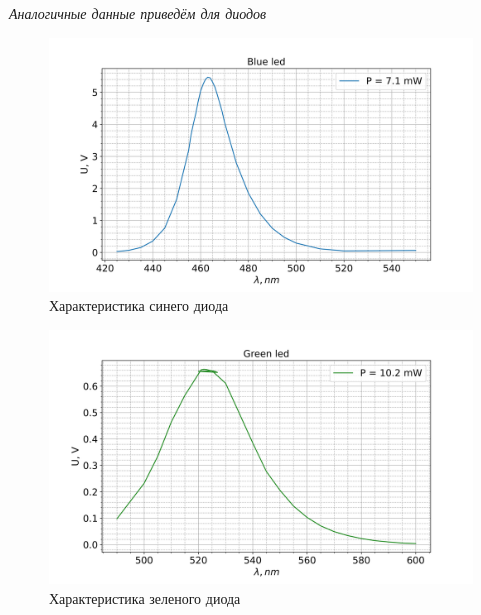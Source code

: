 \documentclass[a4paper]{article}
\begin{document}
        \par \textit{Аналогичные данные приведём для диодов}
        
        \begin{figure}[H]
            \begin{center}
                \includegraphics[scale=0.5]{spectr_blue_led.png}
                \caption{Характеристика синего диода}
                \label{blue}
            \end{center}
        \end{figure}

        \begin{figure}[H]
            \begin{center}
                \includegraphics[scale=0.5]{spectr_green_led.png}
                \caption{Характеристика зеленого диода}
                \label{green}
            \end{center}
        \end{figure}
\end{document}
